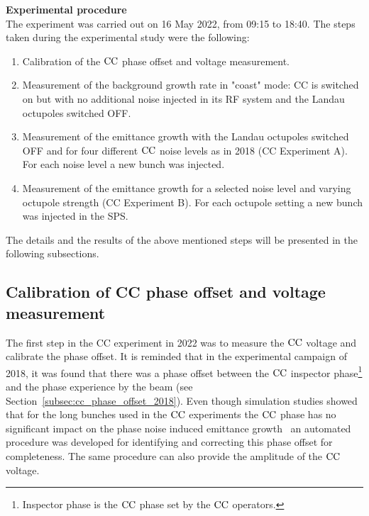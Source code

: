 \textbf{Experimental procedure}\\
The experiment was carried out on 16 May 2022, from 09:15 to 18:40. The steps taken during the experimental study were the following:

\begin{enumerate}
   \item Calibration of the ${\mathrm{CC}}$ phase offset and voltage measurement.
   \item Measurement of the background growth rate in "coast" mode: CC is switched on but with no additional noise injected in its RF system and the Landau octupoles switched OFF.
   \item Measurement of the emittance growth with the Landau octupoles switched OFF and for four different ${\mathrm{CC}}$ noise levels as in 2018 (CC Experiment A). For each noise level a new bunch was injected.
   \item Measurement of the emittance growth for a selected noise level and varying octupole strength (CC Experiment B). For each octupole setting a new bunch was injected in the SPS.
\end{enumerate}


The details and the results of the above mentioned steps will be presented in the following subsections.

\subsection{Calibration of CC phase offset and voltage measurement}\label{subsec:cc_calibration_2022}
The first step in the CC experiment in 2022 was to measure the ${\mathrm{CC}}$ voltage and calibrate the phase offset. It is reminded that in the experimental campaign of 2018, it was found that there was a phase offset between the ${\mathrm{CC}}$ inspector phase\footnote{Inspector phase is the ${\mathrm{CC}}$ phase set by the ${\mathrm{CC}}$ operators.} and the phase experience by the beam (see Section~\ref{subsec:cc_phase_offset_2018}). Even though simulation studies showed that for the long bunches used in the ${\mathrm{CC}}$ experiments the ${\mathrm{CC}}$ phase has no significant impact on the phase noise induced emittance growth~\cite{wp4_triantafyllou_2020} an automated procedure was developed for identifying and correcting this phase offset for completeness. The same procedure can also provide the amplitude of the ${\mathrm{CC}}$ voltage.

